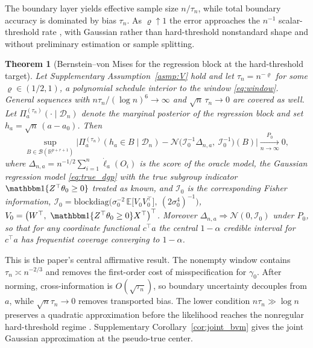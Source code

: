 \documentclass[11pt]{article}
\newtheorem{theorem}{Theorem}
\theoremstyle{definition}
\theoremstyle{plain}
\newcommand{\E}{\mathbb{E}}
\newcommand{\R}{\mathbb{R}}
\begin{document}
The boundary layer yields effective sample size $n/\tau_n$, while total boundary accuracy is dominated by bias $\tau_n$. As $\varrho\uparrow1$ the error approaches the $n^{-1}$ scalar-threshold rate \citep{Chan1993,Hansen2000,ChernozhukovHong2004}, with Gaussian rather than hard-threshold nonstandard shape \citep{KimPollard1990,SeoLinton2007} and without preliminary estimation or sample splitting.

\begin{theorem}[Bernstein--von Mises for the regression block at the hard-threshold target]
\label{thm:effect_bvm}
Let Supplementary Assumption~\ref{asmp:V} hold and let $\tau_n=n^{-\varrho}$ for some $\varrho\in(1/2,1)$, a polynomial schedule interior to the window \eqref{eq:window}. General sequences with $n\tau_n/(\log n)^{6}\to\infty$ and $\sqrt n\,\tau_n\to0$ are covered as well. Let $\Pi_a^{(\tau_n)}(\cdot\mid\mathcal D_n)$ denote the marginal posterior of the regression block and set $h_a=\sqrt n\,(a-a_0)$. Then
\[
\sup_{B\in\mathcal B(\R^{p+r+1})}
\Big|\Pi_a^{(\tau_n)}(h_a\in B\mid\mathcal D_n)-\mathcal N\big(\mathcal I_0^{-1}\Delta_{n,a},\ \mathcal I_0^{-1}\big)(B)\Big|
\xrightarrow[n\to\infty]{P_0}0,
\]
where $\Delta_{n,a}=n^{-1/2}\sum_{i=1}^n\dot\ell_{a}(O_i)$ is the score of the oracle model, the Gaussian regression model \eqref{eq:true_dgp} with the true subgroup indicator $\mathbbm 1\{Z^\top\theta_0\ge0\}$ treated as known, and $\mathcal I_0$ is the corresponding Fisher information, $\mathcal I_0=\mathrm{blockdiag}\Big(\sigma_0^{-2}\,\E\big[V_0V_0^\top\big],\ (2\sigma_0^4)^{-1}\Big)$, $V_0=\big(W^\top,\ \mathbbm 1\{Z^\top\theta_0\ge0\}X^\top\big)^\top$.
Moreover $\Delta_{n,a}\Rightarrow\mathcal N(0,\mathcal I_0)$ under $P_0$, so that for any coordinate functional $c^\top a$ the central $1-\alpha$ credible interval for $c^\top a$ has frequentist coverage converging to $1-\alpha$.
\end{theorem}

This is the paper's central affirmative result. The nonempty window contains $\tau_n\asymp n^{-2/3}$ and removes the first-order cost of misspecification for $\gamma_0$. After norming, cross-information is $O(\sqrt{\tau_n})$, so boundary uncertainty decouples from $a$, while $\sqrt n\tau_n\to0$ removes transported bias. The lower condition $n\tau_n\gg\log n$ preserves a quadratic approximation before the likelihood reaches the nonregular hard-threshold regime \citep{ChernozhukovHong2004,Yu2012}. Supplementary Corollary~\ref{cor:joint_bvm} gives the joint Gaussian approximation at the pseudo-true center.
\end{document}
